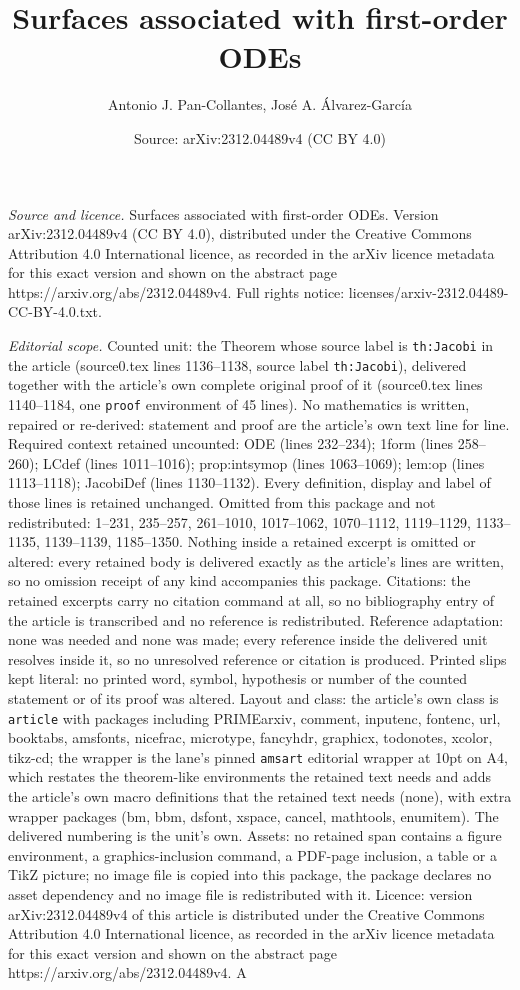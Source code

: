 \documentclass[10pt,a4paper]{amsart}
\title[Surfaces associated with first-order ODEs]{Surfaces associated with first-order ODEs}
\author{Antonio J. Pan-Collantes, Jos\'e A. \'Alvarez-Garc\'ia}
\date{Source: arXiv:2312.04489v4 (CC BY 4.0)}
\begin{document}
\maketitle

\noindent\emph{Source and licence.} Surfaces associated with first-order ODEs. Version arXiv:2312.04489v4 (CC BY 4.0), distributed under the Creative Commons Attribution 4.0 International licence, as recorded in the arXiv licence metadata for this exact version and shown on the abstract page https://arxiv.org/abs/2312.04489v4. Full rights notice: licenses/arxiv-2312.04489-CC-BY-4.0.txt.\par\smallskip

\noindent\textit{Editorial scope.} Counted unit: the Theorem whose source label is \texttt{th:Jacobi} in the article (source0.tex lines 1136--1138, source label \texttt{th:Jacobi}), delivered together with the article's own complete original proof of it (source0.tex lines 1140--1184, one \texttt{proof} environment of 45 lines). No mathematics is written, repaired or re-derived: statement and proof are the article's own text line for line. Required context retained uncounted: ODE (lines 232--234); 1form (lines 258--260); LCdef (lines 1011--1016); prop:intsymop (lines 1063--1069); lem:op (lines 1113--1118); JacobiDef (lines 1130--1132). Every definition, display and label of those lines is retained unchanged. Omitted from this package and not redistributed: 1--231, 235--257, 261--1010, 1017--1062, 1070--1112, 1119--1129, 1133--1135, 1139--1139, 1185--1350. Nothing inside a retained excerpt is omitted or altered: every retained body is delivered exactly as the article's lines are written, so no omission receipt of any kind accompanies this package. Citations: the retained excerpts carry no citation command at all, so no bibliography entry of the article is transcribed and no reference is redistributed. Reference adaptation: none was needed and none was made; every reference inside the delivered unit resolves inside it, so no unresolved reference or citation is produced. Printed slips kept literal: no printed word, symbol, hypothesis or number of the counted statement or of its proof was altered. Layout and class: the article's own class is \texttt{article} with packages including PRIMEarxiv, comment, inputenc, fontenc, url, booktabs, amsfonts, nicefrac, microtype, fancyhdr, graphicx, todonotes, xcolor, tikz-cd; the wrapper is the lane's pinned \texttt{amsart} editorial wrapper at 10pt on A4, which restates the theorem-like environments the retained text needs and adds the article's own macro definitions that the retained text needs (none), with extra wrapper packages (bm, bbm, dsfont, xspace, cancel, mathtools, enumitem). The delivered numbering is the unit's own. Assets: no retained span contains a figure environment, a graphics-inclusion command, a PDF-page inclusion, a table or a TikZ picture; no image file is copied into this package, the package declares no asset dependency and no image file is redistributed with it. Licence: version arXiv:2312.04489v4 of this article is distributed under the Creative Commons Attribution 4.0 International licence, as recorded in the arXiv licence metadata for this exact version and shown on the abstract page https://arxiv.org/abs/2312.04489v4. A 
\end{document}
